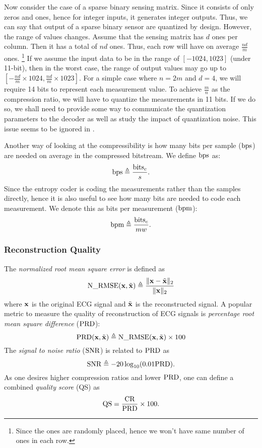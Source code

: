 Now consider the case of a sparse binary sensing
matrix. Since it consists of only zeros and ones,
hence for integer inputs, it generates integer
outputs. Thus, we can say that output of a sparse
binary sensor are quantized by design.
However, the range of values changes.
Assume that the sensing matrix has $d$ ones per column.
Then it has a total of $n d$ ones. Thus, each row
will have on average $\frac{n d}{m}$ ones.
\footnote{Since the ones are randomly placed, hence
we won't have same number of ones in each row.}
If we assume the input data to be in the range
of $[-1024, 1023]$ (under 11-bit), then in the
worst case, the range of output values may go
up to$[-\frac{n d}{m} \times 1024, \frac{n d}{m} \times 1023]$.
For a simple case where $n = 2m$ and $d=4$, we will require
14 bits to represent each measurement value.
To achieve $\frac{m}{n}$ as the compression ratio, we will
have to quantize the measurements in 11 bits. If we do so,
we shall need to provide some way to communicate the quantization
parameters to the decoder as well as study the impact of
quantization noise.
This issue seems to be ignored in \cite{zhang2012compressed}.

Another way of looking at the compressibility is how
many bits per sample ($\mathrm{bps}$) are needed on average in the compressed
bitstream. We define $\mathrm{bps}$ as:
\begin{equation}
\mathrm{bps} \triangleq \frac{\mathrm{bits}_c}{s}.
\end{equation}
Since the entropy coder is coding the measurements rather than
the samples directly, hence it is also useful to see how
many bits are needed to code each measurement. We
denote this as bits per measurement ($\mathrm{bpm}$):
\begin{equation}
\mathrm{bpm} \triangleq \frac{\mathrm{bits}_c}{m w}.
\end{equation}

\subsubsection{Reconstruction Quality}
The \emph{normalized root mean square error} is defined as
\begin{equation}
\mathrm{N\_RMSE} (\mathbf{x}, \tilde{\mathbf{x}}) \triangleq \frac{\| \mathbf{x} - \tilde{\mathbf{x}}\|_2}{\| \mathbf{x} \|_2}
\end{equation}
where $\mathbf{x}$ is the original ECG signal and $\tilde{\mathbf{x}}$
is the reconstructed signal.
A popular metric to measure the quality of reconstruction
of ECG signals is
\emph{percentage root mean square difference} ($\mathrm{PRD}$):
\begin{equation}
\mathrm{PRD}(\mathbf{x}, \tilde{\mathbf{x}}) \triangleq \mathrm{N\_RMSE}(\mathbf{x}, \tilde{\mathbf{x}}) \times 100
\end{equation}
The \emph{signal to noise ratio} ($\mathrm{SNR}$) is related to $\mathrm{PRD}$ as
\begin{equation}
\mathrm{SNR} \triangleq -20 \log_{10}(0.01 \mathrm{PRD}).
\end{equation}
As one desires higher compression ratios and lower
$\mathrm{PRD}$, one can define a combined \emph{quality score} (QS) as
\begin{equation}
\text{QS} = \frac{\mathrm{CR}}{\mathrm{PRD}} \times 100.
\end{equation}


